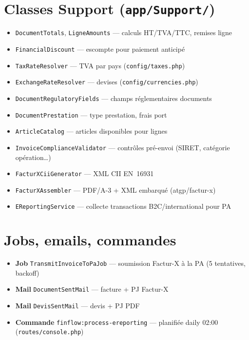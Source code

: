 \documentclass[11pt,a4paper]{report}
\newcommand{\filepath}[1]{\texttt{\small #1}}
\begin{document}
\section{Classes Support (\filepath{app/Support/})}

\begin{itemize}[leftmargin=1.5em]
    \item \texttt{DocumentTotals}, \texttt{LigneAmounts} — calculs HT/TVA/TTC, remises ligne
    \item \texttt{FinancialDiscount} — escompte pour paiement anticipé
    \item \texttt{TaxRateResolver} — TVA par pays (\filepath{config/taxes.php})
    \item \texttt{ExchangeRateResolver} — devises (\filepath{config/currencies.php})
    \item \texttt{DocumentRegulatoryFields} — champs réglementaires documents
    \item \texttt{DocumentPrestation} — type prestation, frais port
    \item \texttt{ArticleCatalog} — articles disponibles pour lignes
    \item \texttt{InvoiceComplianceValidator} — contrôles pré-envoi (SIRET, catégorie opération…)
    \item \texttt{FacturXCiiGenerator} — XML CII EN~16931
    \item \texttt{FacturXAssembler} — PDF/A-3 + XML embarqué (atgp/factur-x)
    \item \texttt{EReportingService} — collecte transactions B2C/international pour PA
\end{itemize}

\section{Jobs, emails, commandes}

\begin{itemize}[leftmargin=1.5em]
    \item \textbf{Job} \texttt{TransmitInvoiceToPaJob} — soumission Factur-X à la PA (5 tentatives, backoff)
    \item \textbf{Mail} \texttt{DocumentSentMail} — facture + PJ Factur-X
    \item \textbf{Mail} \texttt{DevisSentMail} — devis + PJ PDF
    \item \textbf{Commande} \texttt{finflow:process-ereporting} — planifiée daily 02:00 (\filepath{routes/console.php})
\end{itemize}
\end{document}
